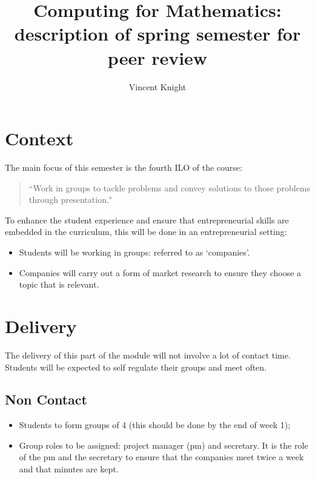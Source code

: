 \documentclass{article}
\title{Computing for Mathematics: description of spring semester for peer review}
\author{Vincent Knight}
\date{}
\begin{document}
\maketitle

\section{Context}

The main focus of this semester is the fourth ILO of the course:

\begin{quote}
    ``Work in groups to tackle problems and convey solutions to those problems through presentation."
\end{quote}

To enhance the student experience and ensure that entrepreneurial skills are embedded in the curriculum, this will be done in an entrepreneurial setting:

\begin{itemize}
    \item Students will be working in groups: referred to as `companies'.
    \item Companies will carry out a form of market research to ensure they choose a topic that is relevant.
\end{itemize}


\section{Delivery}

The delivery of this part of the module will not involve a lot of contact time. Students will be expected to self regulate their groups and meet often.

    \subsection{Non Contact}

        \begin{itemize}
            \item Students to form groups of 4 (this should be done by the end of week 1);
            \item Group roles to be assigned: project manager (pm) and secretary. It is the role of the pm and the secretary to ensure that the companies meet twice a week and that minutes are kept.
        \end{itemize}
\end{document}
